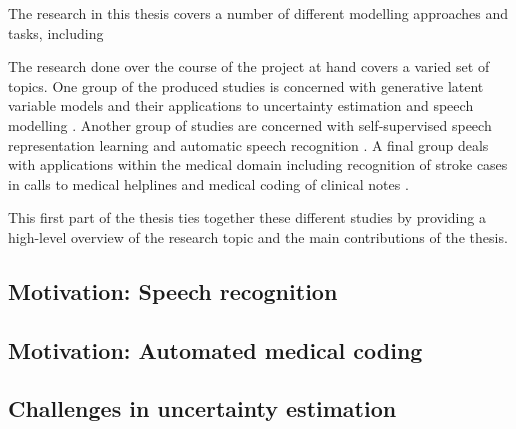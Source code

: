 


The research in this thesis covers a number of different modelling approaches and tasks, including 


The research done over the course of the project at hand covers a varied set of topics. One group of the produced studies is concerned with generative latent variable models and their applications to uncertainty estimation and speech modelling \cite{havtorn_hierarchical_2021,havtorn_benchmarking_2022,bergamin_modelagnostic_2022}. Another group of studies are concerned with self-supervised speech representation learning and automatic speech recognition \cite{borgholt_scaling_2021,borgholt_we_2021,mohamed_selfsupervised_2022,borgholt_brief_2022}. A final group deals with applications within the medical domain including recognition of stroke cases in calls to medical helplines \cite{wenstrup_retrospective_2023} and medical coding of clinical notes \cite{edin_automated_2023}.

This first part of the thesis ties together these different studies by providing a high-level overview of the research topic and the main contributions of the thesis.



\subsection{Motivation: Speech recognition}


\subsection{Motivation: Automated medical coding}


\subsection{Challenges in uncertainty estimation}




